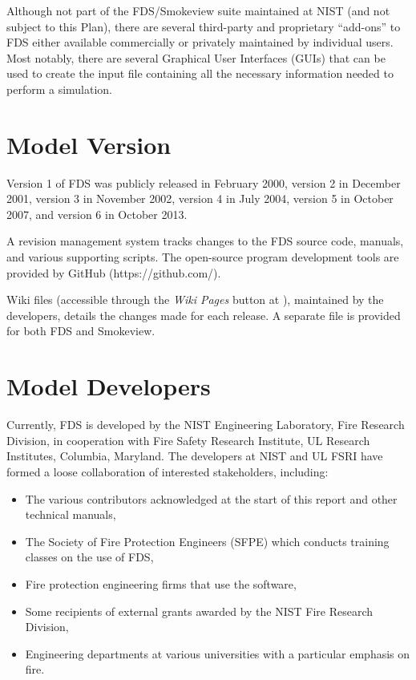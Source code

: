 \documentclass[11pt]{book}
\begin{document}
Although not part of the FDS/Smokeview suite maintained at NIST (and not subject to this Plan), there are several third-party and proprietary ``add-ons'' to FDS either available
commercially or privately maintained by individual users. Most notably, there are several Graphical User Interfaces (GUIs) that can be used to create
the input file containing all the necessary information needed to perform a simulation.



\section{Model Version}

Version 1 of FDS was publicly released in February 2000, version 2 in December 2001, version 3 in November 2002, version 4 in July 2004, version 5 in October 2007, and version 6 in October 2013.

A revision management system tracks changes to the FDS source code, manuals, and various supporting scripts. The open-source program development tools are provided by GitHub (https://github.com/).

Wiki files (accessible through the \emph{Wiki Pages} button at \href{https://pages.nist.gov/fds-smv} {}), maintained by the developers, details the changes made for each release. A separate file is provided for both FDS and Smokeview.


\section{Model Developers}


Currently, FDS is developed by the NIST Engineering Laboratory, Fire Research Division, in cooperation with Fire Safety Research Institute, UL Research Institutes, Columbia, Maryland. The developers at NIST and UL FSRI have formed a loose collaboration of interested stakeholders, including:
\begin{itemize}
\item The various contributors acknowledged at the start of this report and other technical manuals,
\item The Society of Fire Protection Engineers (SFPE) which conducts training classes on the use of FDS,
\item Fire protection engineering firms that use the software,
\item Some recipients of external grants awarded by the NIST Fire Research Division,
\item Engineering departments at various universities with a particular emphasis on fire.
\end{itemize}
\end{document}
